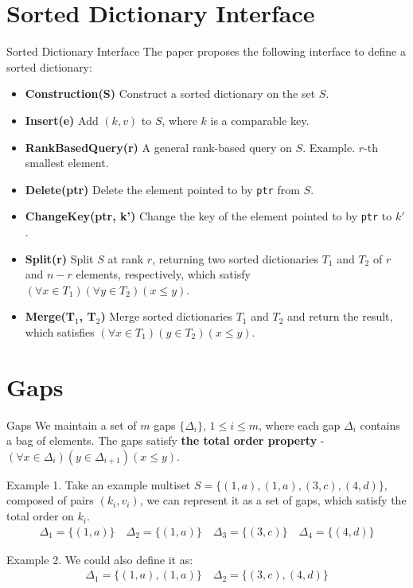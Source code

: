 \documentclass[aspectratio=169,xcolor=dvipsnames]{beamer}
\begin{document}
\section{Sorted Dictionary Interface}
\begin{frame}{Sorted Dictionary Interface}
    The paper proposes the following interface to define a sorted dictionary:

    \begin{itemize}
        \item \textbf{Construction(S)} Construct a sorted dictionary on the set $S$.
        \item \textbf{Insert(e)} Add $(k, v)$ to $S$, where $k$ is a comparable key.
        \item \textbf{RankBasedQuery(r)} A general rank-based query on $S$. Example. $r$-th smallest element.
        \item \textbf{Delete(ptr)} Delete the element pointed to by \texttt{ptr} from $S$.
        \item \textbf{ChangeKey(ptr, k')} Change the key of the element pointed to by \texttt{ptr} to $k'$.
        \item \textbf{Split(r)} Split $S$ at rank $r$, returning two sorted dictionaries $T_1$ and $T_2$ of $r$ and $n - r$ elements, respectively, which satisfy $\left(\forall x \in T_1\right)\left(\forall y \in T_2\right)\left(x \leq y\right)$.
        \item \textbf{Merge(T$_1$, T$_2$)} Merge sorted dictionaries $T_1$ and $T_2$ and return the result, which satisfies $\left(\forall x \in T_1\right)\left(y \in T_2\right)\left(x \leq y\right)$.
    \end{itemize}

\end{frame}


\section{Gaps}
\begin{frame}{Gaps}
    We maintain a set of $m$ gaps $\{\Delta_i\}$, $1 \leq i \leq m$, where each gap $\Delta_i$ contains a bag of elements. 
    The gaps satisfy \textbf{the total order property} - $\left(\forall x \in \Delta_i\right)\left(y \in \Delta_{i+1}\right)\left(x \leq y\right)$.

    \vspace{0.25cm}

    Example 1. Take an example multiset $S = \{(1,a),(1,a),(3,c),(4,d)\}$, composed of pairs $(k_i,v_i)$, we can represent it as a set of gaps, which satisfy the total order on $k_i$.
    \begin{align*}
        \Delta_1 = \{(1,a)\} \quad \Delta_2 = \{(1,a)\} \quad \Delta_3 = \{(3,c)\} \quad \Delta_4 = \{(4,d)\}
    \end{align*}

    Example 2. We could also define it as:
    \begin{align*}
        \Delta_1 = \{(1,a),(1,a)\} \quad \Delta_2 = \{(3,c),(4,d)\}
    \end{align*}
\end{frame}
\end{document}

